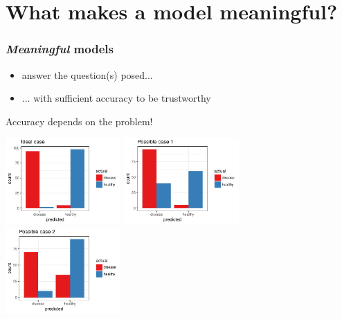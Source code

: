 \documentclass[handout, c, 11pt, xcolor=svgnames, hyperref={colorlinks,citecolor=DeepPink4,linkcolor=DarkRed,urlcolor=DarkBlue}]{beamer} %
\begin{document}

\section{What makes a model meaningful?}

\begin{frame}
	\frametitle{\textsl{Meaningful} models}
	
	\begin{itemize}
		\item answer the question(s) posed...
		\item ... with sufficient accuracy to be trustworthy
	\end{itemize}

\vspace{0.6cm}

	\begin{center}
		{\Large \alert{Accuracy depends on the problem!}}
		
		\vspace{1cm}
		
		\includegraphics[width=0.33\textwidth]{images/meaningful_1}
		\includegraphics[width=0.33\textwidth]{images/meaningful_2}
		\includegraphics[width=0.33\textwidth]{images/meaningful_3}
	\end{center}
	
	
\end{frame}


\end{document}

